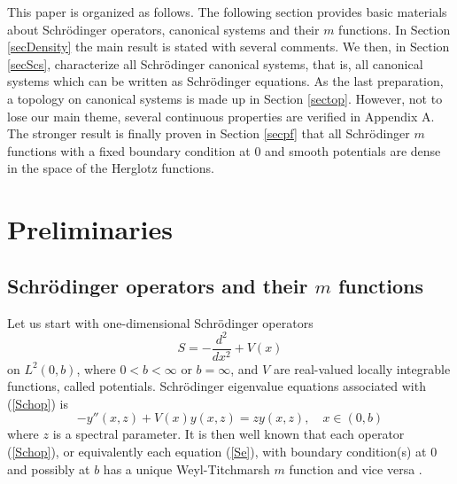 \documentclass[preprint,12pt]{elsarticle}
\begin{document}
This paper is organized as follows.  The following section provides basic materials about Schr\"odinger operators, canonical systems and their $m$ functions. In Section \ref{secDensity} the main result is stated with several comments. We then, in Section \ref{secScs}, characterize all Schr\"odinger canonical systems, that is, all canonical systems which can be written as Schr\"odinger equations. As the last preparation, a topology on canonical systems is made up in Section \ref{sectop}. However, not to lose our main theme, several continuous properties are verified in Appendix A. The stronger result is finally proven in Section \ref{secpf} that all Schr\"odinger $m$ functions with a fixed boundary condition at 0 and smooth potentials are dense in the space of the Herglotz functions. \\

\section{Preliminaries}\label{secpre}
\subsection{Schr\"odinger operators and their $m$ functions} 
Let us start with one-dimensional Schr\"odinger operators 
\begin{equation}\label{Schop}
S=-\frac{d^2}{dx^2}+V(x)
\end{equation}
on $L^2(0,b)$, where $0<b<\infty$ or $b=\infty$, and $V$ are real-valued locally integrable functions, called potentials.   Schr\"odinger eigenvalue equations associated with (\ref{Schop}) is 
\begin{equation}
\label{Se}
-y''(x,z)+V(x)y(x,z)=zy(x,z), \quad x\in(0,b)
\end{equation}
where $z$ is a spectral parameter. It is then well known that each operator (\ref{Schop}), or equivalently each equation (\ref{Se}), with boundary condition(s) at 0 and possibly at $b$ has  a unique Weyl-Titchmarsh $m$ function and vice versa \cite{Borg,Mar1,Titch,Weyl}. 
\end{document}
